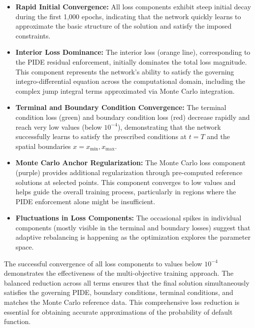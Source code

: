 \documentclass[11pt,twoside,openright]{report}
\begin{document}
\begin{itemize}
    \item \textbf{Rapid Initial Convergence:} All loss components exhibit steep initial decay during the first 1,000 epochs, indicating that the network quickly learns to approximate the basic structure of the solution and satisfy the imposed constraints.

    \item \textbf{Interior Loss Dominance:} The interior loss (orange line), corresponding to the PIDE residual enforcement, initially dominates the total loss magnitude. This component represents the network's ability to satisfy the governing integro-differential equation across the computational domain, including the complex jump integral terms approximated via Monte Carlo integration.

    \item \textbf{Terminal and Boundary Condition Convergence:} The terminal condition loss (green) and boundary condition loss (red) decrease rapidly and reach very low values (below $10^{-4}$), demonstrating that the network successfully learns to satisfy the prescribed conditions at $t=T$ and the spatial boundaries $x=x_{\min}, x_{\max}$.

    \item \textbf{Monte Carlo Anchor Regularization:} The Monte Carlo loss component (purple) provides additional regularization through pre-computed reference solutions at selected points. This component converges to low values and helps guide the overall training process, particularly in regions where the PIDE enforcement alone might be insufficient.

    \item \textbf{Fluctuations in Loss Components:} The occasional spikes in individual components (mostly visible in the terminal and boundary losses) suggest that adaptive rebalancing is happening as the optimization explores the parameter space.
\end{itemize}

The successful convergence of all loss components to values below $10^{-4}$ demonstrates the effectiveness of the multi-objective training approach. The balanced reduction across all terms ensures that the final solution simultaneously satisfies the governing PIDE, boundary conditions, terminal conditions, and matches the Monte Carlo reference data. This comprehensive loss reduction is essential for obtaining accurate approximations of the probability of default function.
\end{document}
